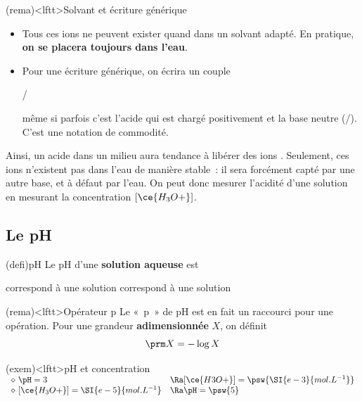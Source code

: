 \documentclass[../../main/main.tex]{subfiles}
\begin{document}
\begin{tcb*}(rema)<lftt>{Solvant et écriture générique}
	\begin{itemize}
		\item Tous ces ions ne peuvent exister quand dans un solvant adapté. En pratique,
		      \textbf{on se placera toujours dans l'eau}.
		\item Pour une écriture générique, on écrira un couple
		      \begin{center}
			      /
		      \end{center}
		      même si parfois c'est l'acide qui est chargé positivement et la base
		      neutre (/). C'est une notation de commodité.
	\end{itemize}
\end{tcb*}

Ainsi, un acide dans un milieu aura tendance à libérer des ions .
Seulement, ces ions n'existent pas dans l'eau de manière stable~: il sera
forcément capté par une autre base, et à défaut par l'eau. On peut donc mesurer
l'acidité d'une solution en mesurant la concentration $[\ce{H_3O+}]$.

\subsection{Le pH}
\begin{tcb*}(defi){pH}
	Le pH d'une \textbf{solution aqueuse} est
	\psw{
		\[
			\pH = - \log (\frac{[\ce{H_3O+}]}{c^\circ})
			\Lra
			[\ce{H_3O+}] = c^\circ10^{-\pH}
		\]
	}
	\vspace{-15pt}
	\begin{itemize}
		 correspond à une solution 
		 correspond à une solution 
	\end{itemize}
\end{tcb*}
\begin{tcb*}(rema)<lftt>{Opérateur p}
	Le «~p~» de pH est en fait un raccourci pour une opération. Pour une grandeur
	\textbf{adimensionnée} $X$, on définit
	\[
		\prm X = - \log X
	\]
\end{tcb*}
\begin{tcb*}(exem)<lftt>{pH et concentration}
	$\begin{array}{ll}
			\diamond~\pH = 3                             & \Ra [\ce{H3O+}] = \psw{\SI{e-3}{mol.L^{-1}}}
			\\
			\diamond~[\ce{H_3O+}] = \SI{e-5}{mol.L^{-1}} & \Ra \pH = \psw{5}
		\end{array}$
\end{tcb*}
\end{document}
